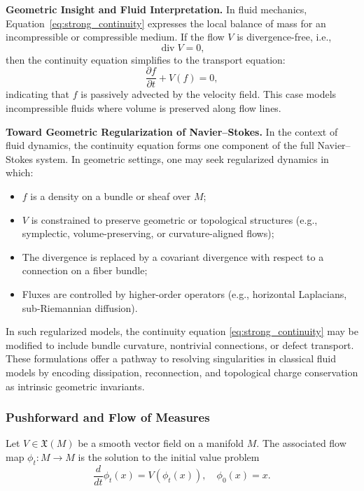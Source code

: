 \textbf{Geometric Insight and Fluid Interpretation.} In fluid mechanics, Equation~\eqref{eq:strong_continuity} expresses the local balance of mass for an incompressible or compressible medium. If the flow $V$ is divergence-free, i.e.,
\[
\operatorname{div} V = 0,
\]
then the continuity equation simplifies to the transport equation:
\[
\frac{\partial f}{\partial t} + V(f) = 0,
\]
indicating that $f$ is passively advected by the velocity field. This case models incompressible fluids where volume is preserved along flow lines.

\textbf{Toward Geometric Regularization of Navier--Stokes.} In the context of fluid dynamics, the continuity equation forms one component of the full Navier--Stokes system. In geometric settings, one may seek regularized dynamics in which:
\begin{itemize}
  \item $f$ is a density on a bundle or sheaf over $M$;
  \item $V$ is constrained to preserve geometric or topological structures (e.g., symplectic, volume-preserving, or curvature-aligned flows);
  \item The divergence is replaced by a covariant divergence with respect to a connection on a fiber bundle;
  \item Fluxes are controlled by higher-order operators (e.g., horizontal Laplacians, sub-Riemannian diffusion).
\end{itemize}

In such regularized models, the continuity equation \eqref{eq:strong_continuity} may be modified to include bundle curvature, nontrivial connections, or defect transport. These formulations offer a pathway to resolving singularities in classical fluid models by encoding dissipation, reconnection, and topological charge conservation as intrinsic geometric invariants.


\subsubsection{Pushforward and Flow of Measures}
\label{subsec:pushforward_measures}

\begin{definition}
Let $V \in \mathfrak{X}(M)$ be a smooth vector field on a manifold $M$. The associated flow map $\phi_t : M \to M$ is the solution to the initial value problem
\begin{equation}
\label{eq:flow_ode}
\frac{d}{dt} \phi_t(x) = V(\phi_t(x)), \quad \phi_0(x) = x.
\end{equation}
\end{definition}

